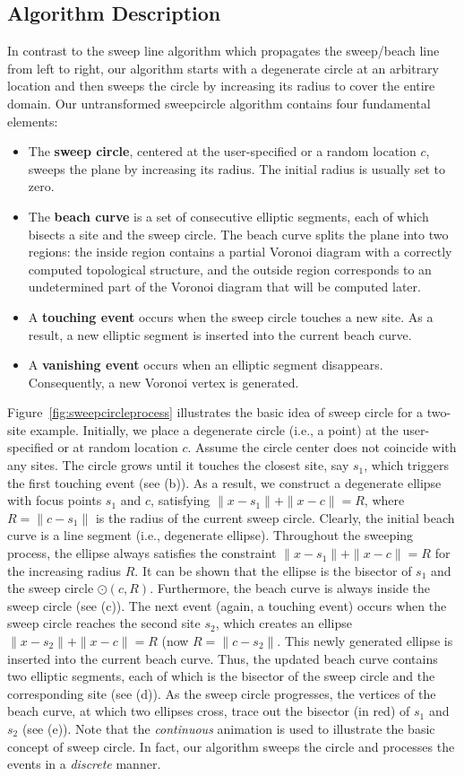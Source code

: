 \subsection{Algorithm Description}
In contrast to the sweep line algorithm which propagates the
sweep/beach line from left to right, our algorithm starts with a
degenerate circle at an arbitrary location and then sweeps the circle
by increasing its radius to cover the entire domain. Our untransformed sweepcircle algorithm contains four fundamental elements:
\begin{itemize}
\item The \textbf{sweep circle}, centered at the user-specified or a random location $c$, sweeps the plane by increasing its radius. The initial radius is usually set to zero.
\item The \textbf{beach curve} is a set of consecutive elliptic segments, each of which bisects a site and the sweep circle. The beach curve splits the
plane into two regions: the inside region contains a partial Voronoi
diagram with a correctly computed topological structure, and the
outside region corresponds to an undetermined part of the Voronoi
diagram that will be computed later.
\item A \textbf{touching event} occurs when the sweep circle touches a new site. As a result, a new elliptic segment is inserted into the current beach curve.
\item A \textbf{vanishing event} occurs when an elliptic segment
disappears. Consequently, a new Voronoi vertex is generated.
\end{itemize}

Figure~\ref{fig:sweepcircleprocess} illustrates the basic idea of
sweep circle for a two-site example. Initially, we place a
degenerate circle (i.e., a point) at the user-specified or at random
location $c$. Assume the circle center does not coincide with any
sites. The circle grows until it touches the closest site, say
$s_1$, which triggers the first touching event (see (b)). As a
result, we construct a degenerate ellipse with focus points $s_1$
and $c$, satisfying $\|x-s_1\|+\|x-c\|=R$, where $R=\|c-s_1\|$ is the
radius of the current sweep circle. Clearly, the initial beach curve
is a line segment (i.e., degenerate ellipse). Throughout the
sweeping process, the ellipse always satisfies the constraint
$\|x-s_1\|+\|x-c\|=R$ for the increasing radius $R$. It can be shown
that the ellipse is the bisector of $s_1$ and the sweep circle
$\odot(c,R)$. Furthermore, the beach curve is always inside the
sweep circle (see (c)). The next event (again, a touching event)
occurs when the sweep circle reaches the second site $s_2$, which
creates an ellipse $\|x-s_2\|+\|x-c\|=R$ (now $R=\|c-s_2\|$. This
newly generated ellipse is inserted into the current beach curve.
Thus, the updated beach curve contains two elliptic segments, each
of which is the bisector of the sweep circle and the corresponding
site (see (d)). As the sweep circle progresses, the vertices of the
beach curve, at which two ellipses cross, trace out the bisector (in
red) of $s_1$ and $s_2$ (see (e)). Note that the \textit{continuous}
animation is used to illustrate the basic concept of sweep circle.
In fact, our algorithm sweeps the circle and processes the events in
a \textit{discrete} manner.

